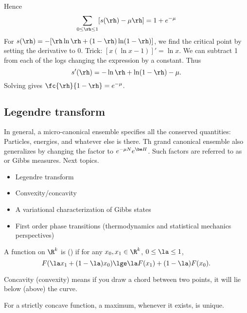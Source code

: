 Hence 
\[
\sum_{0\le \rh\le 1}[s(\rh) - \mu\rh] = 1+e^{-\mu}
\]
For $s(\rh) = -[\rh\ln \rh +(1-\rh) \ln (1-\rh)]$, we find the critical point by setting the derivative to 0. %
Trick: $[x(\ln x-1)]'=\ln x$. We can subtract 1 from each of the logs changing the expression by a constant. Thus
\[
s'(\rh) = -\ln \rh +\ln (1-\rh) - \mu.
\]
Solving gives $\fc{\rh}{1-\rh}=e^{-\mu}$. 

\subsection{Legendre transform}
In general, a micro-canonical ensemble specifies all the conserved quantities: Particles, energies, and whatever else is there. Th grand canonical ensemble also generalizes by changing the factor to $e^{-\mu N} e^{\be H}$.
Such factors are referred to as  %
or Gibbs measures.
Next topics.
\begin{itemize}
\item
Legendre transform
\item
Convexity/concavity
\item A variational characterization of Gibbs states
\item First order phase transitions (thermodynamics and statistical mechanics perspectives)
\end{itemize}

\begin{df}
A function on $\R^k$ is  () if for any $x_0,x_1\in \R^k$, $0\le \la \le 1$,
\[
F(\la x_1+(1-\la)x_0)\lge \la F(x_1)+(1-\la) F(x_0).
\]
\end{df}
Concavity (convexity) means if you draw a chord between two points, it will lie below (above) the curve.

For a strictly concave function, a maximum, whenever it exists, is unique.

